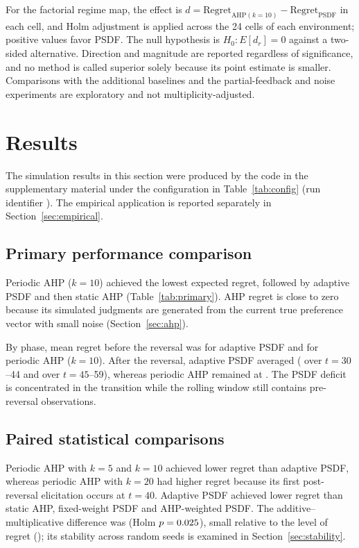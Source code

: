\documentclass[12pt,a4paper]{article}
\begin{document}
For the factorial regime map, the effect is $d=\mathrm{Regret}_{\mathrm{AHP}(k=10)}-\mathrm{Regret}_{\mathrm{PSDF}}$ in each cell, and Holm adjustment is applied across the 24 cells of each environment; positive values favor PSDF. The null hypothesis is $H_0:E[d_r]=0$ against a two-sided alternative. Direction and magnitude are reported regardless of significance, and no method is called superior solely because its point estimate is smaller. Comparisons with the additional baselines and the partial-feedback and noise experiments are exploratory and not multiplicity-adjusted.

\section{Results}\label{sec:results}
The simulation results in this section were produced by the code in the supplementary material under the configuration in Table~\ref{tab:config} (run identifier \texttt{\RunID}). The empirical application is reported separately in Section~\ref{sec:empirical}.

\subsection{Primary performance comparison}
Periodic AHP ($k=10$) achieved the lowest expected regret, followed by adaptive PSDF and then static AHP (Table~\ref{tab:primary}). AHP regret is close to zero because its simulated judgments are generated from the current true preference vector with small noise (Section~\ref{sec:ahp}).

\begin{table}[t]
\centering\small
\caption{Primary expected-regret comparison (100 replications; bootstrap 95\% CI of the mean).}\label{tab:primary}

\end{table}

By phase, mean regret before the reversal was \PreAdaptive{} for adaptive PSDF and \PreAHPTen{} for periodic AHP ($k=10$). After the reversal, adaptive PSDF averaged \PostAdaptive{} (\TransAdaptive{} over $t=30$--44 and \LateAdaptive{} over $t=45$--59), whereas periodic AHP remained at \PostAHPTen{}. The PSDF deficit is concentrated in the transition while the rolling window still contains pre-reversal observations.

\subsection{Paired statistical comparisons}
Periodic AHP with $k=5$ and $k=10$ achieved lower regret than adaptive PSDF, whereas periodic AHP with $k=20$ had higher regret because its first post-reversal elicitation occurs at $t=40$. Adaptive PSDF achieved lower regret than static AHP, fixed-weight PSDF and AHP-weighted PSDF. The additive--multiplicative difference was \AddDiff{} (Holm $p=0.025$), small relative to the level of regret (\RegAdaptive); its stability across random seeds is examined in Section~\ref{sec:stability}.
\end{document}
